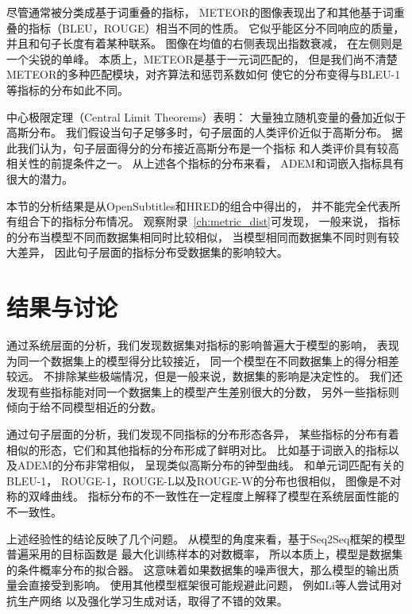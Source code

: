 尽管通常被分类成基于词重叠的指标，
METEOR的图像表现出了和其他基于词重叠的指标（BLEU，ROUGE）相当不同的性质。
它似乎能区分不同响应的质量，并且和句子长度有着某种联系。
图像在均值的右侧表现出指数衰减， 在左侧则是一个尖锐的单峰。
本质上，METEOR是基于一元词匹配的，
但是我们尚不清楚METEOR的多种匹配模块，对齐算法和惩罚系数如何
使它的分布变得与BLEU-1等指标的分布如此不同。

中心极限定理（Central Limit Theorems）表明：
大量独立随机变量的叠加近似于高斯分布。
我们假设当句子足够多时，句子层面的人类评价近似于高斯分布。
据此我们认为，句子层面得分的分布接近高斯分布是一个指标
和人类评价具有较高相关性的前提条件之一。
从上述各个指标的分布来看， ADEM和词嵌入指标具有很大的潜力。

本节的分析结果是从OpenSubtitles和HRED的组合中得出的，
并不能完全代表所有组合下的指标分布情况。
观察附录~\ref{ch:metric_dist}可发现， 一般来说，
指标的分布当模型不同而数据集相同时比较相似，
当模型相同而数据集不同时则有较大差异，
因此句子层面的指标分布受数据集的影响较大。

\section{结果与讨论}\label{sec:result_and_discussion}
通过系统层面的分析，我们发现数据集对指标的影响普遍大于模型的影响，
表现为同一个数据集上的模型得分比较接近，
同一个模型在不同数据集上的得分相差较远。
不排除某些极端情况，但是一般来说，数据集的影响是决定性的。
我们还发现有些指标能对同一个数据集上的模型产生差别很大的分数，
另外一些指标则倾向于给不同模型相近的分数。

通过句子层面的分析，我们发现不同指标的分布形态各异，
某些指标的分布有着相似的形态，它们和其他指标的分布形成了鲜明对比。
比如基于词嵌入的指标以及ADEM的分布非常相似，
呈现类似高斯分布的钟型曲线。
和单元词匹配有关的BLEU-1，
ROUGE-1，ROUGE-L以及ROUGE-W的分布也很相似，
图像是不对称的双峰曲线。
指标分布的不一致性在一定程度上解释了模型在系统层面性能的不一致性。

上述经验性的结论反映了几个问题。
从模型的角度来看，基于Seq2Seq框架的模型普遍采用的目标函数是
最大化训练样本的对数概率，
所以本质上，模型是数据集的条件概率分布的拟合器。
这意味着如果数据集的噪声很大，那么模型的输出质量会直接受到影响。
使用其他模型框架很可能规避此问题，
例如Li等人尝试用对抗生产网络
以及强化学习生成对话，取得了不错的效果。

